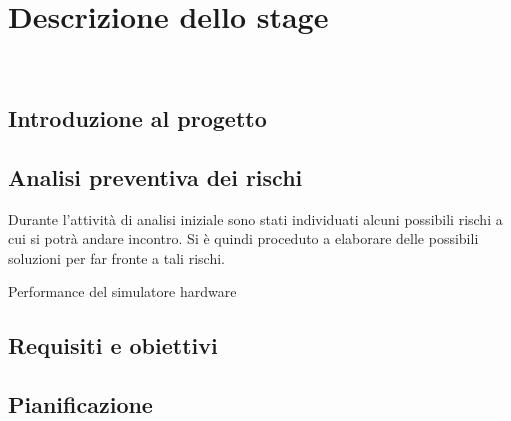 \chapter{Descrizione dello stage}
\label{cap:descrizione-stage}

\\

\section{Introduzione al progetto}

\section{Analisi preventiva dei rischi}

Durante l'attività di analisi iniziale sono stati individuati alcuni possibili rischi a cui si potrà andare incontro.
Si è quindi proceduto a elaborare delle possibili soluzioni per far fronte a tali rischi.\\

\begin{risk}{Performance del simulatore hardware}
    \label{risk:hardware-simulator} 
\end{risk}

\section{Requisiti e obiettivi}


\section{Pianificazione}

